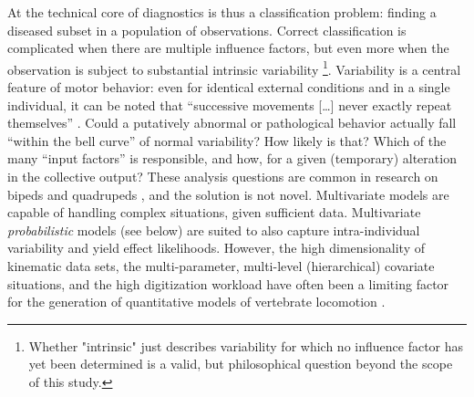 At the technical core of diagnostics is thus a classification problem: finding a diseased subset in a population of observations.
Correct classification is complicated when there are multiple influence factors, but even more when the observation is subject to substantial intrinsic variability \footnote{Whether "intrinsic" just describes variability for which no influence factor has yet been determined is a valid, but philosophical question beyond the scope of this study.}.
Variability is a central feature of motor behavior: even for identical external conditions and in a single individual, it can be noted that ``successive movements [\ldots{}] never exactly repeat themselves'' \citep{Bernstein1935}.
Could a putatively abnormal or pathological behavior actually fall ``within the bell curve'' of normal variability?
How likely is that?
Which of the many ``input factors'' is responsible, and how, for a given (temporary) alteration in the collective output?
These analysis questions are common in research on bipeds  \citep[e.g.][]{Ganley2005,StifflerJoachim2020,Bruton2013} and quadrupeds  \citep[e.g.][]{Irschick1999,Pike2002,Stavrakakis2014}, and the solution is not novel.
Multivariate models are capable of handling complex situations, given sufficient data.
Multivariate \emph{probabilistic} models (see below) are suited to also capture intra-individual variability and yield effect likelihoods.
However, the high dimensionality of kinematic data sets, the multi-parameter, multi-level (hierarchical) covariate situations, and the high digitization workload have often been a limiting factor for the generation of quantitative models of vertebrate locomotion \citep{Seethapathi2019,Michelini2020,Jackson2016}.


\bigskip

